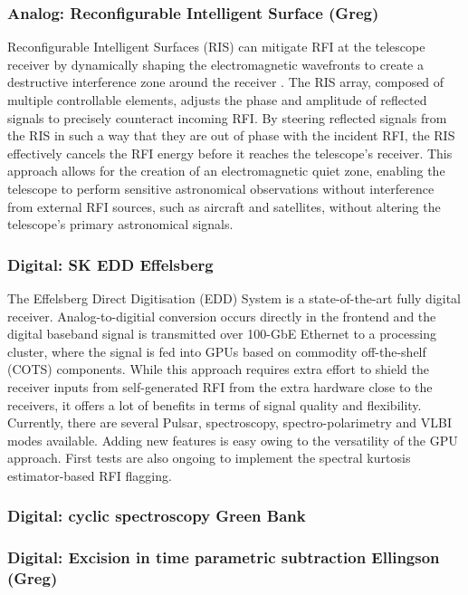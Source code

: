 \subsubsection{Analog: Reconfigurable Intelligent Surface (Greg)}

Reconfigurable Intelligent Surfaces (RIS) can mitigate RFI at the telescope receiver by dynamically shaping the electromagnetic wavefronts to create a destructive interference zone around the receiver \cite{zou2022scisrs,wei2024ris,wei2023multistage}. The RIS array, composed of multiple controllable elements, adjusts the phase and amplitude of reflected signals to precisely counteract incoming RFI. By steering reflected signals from the RIS in such a way that they are out of phase with the incident RFI, the RIS effectively cancels the RFI energy before it reaches the telescope’s receiver. This approach allows for the creation of an electromagnetic quiet zone, enabling the telescope to perform sensitive astronomical observations without interference from external RFI sources, such as aircraft and satellites, without altering the telescope’s primary astronomical signals.

\subsubsection{Digital: SK EDD Effelsberg}
The Effelsberg Direct Digitisation (EDD) System is a state-of-the-art fully digital receiver. Analog-to-digitial conversion occurs directly in the frontend and the digital baseband signal is transmitted over 100-GbE Ethernet to a processing cluster, where the signal is fed into GPUs based on commodity off-the-shelf (COTS) components. While this approach requires extra effort to shield the receiver inputs from self-generated RFI from the extra hardware close to the receivers, it offers a lot of benefits in terms of signal quality and flexibility. Currently, there are several Pulsar, spectroscopy, spectro-polarimetry and VLBI modes available. Adding new features is easy owing to the versatility of the GPU approach. First tests are also ongoing to implement the spectral kurtosis estimator-based RFI flagging. 

\subsubsection{Digital: cyclic spectroscopy Green Bank}

\subsubsection{Digital: Excision in time parametric subtraction Ellingson (Greg)}

